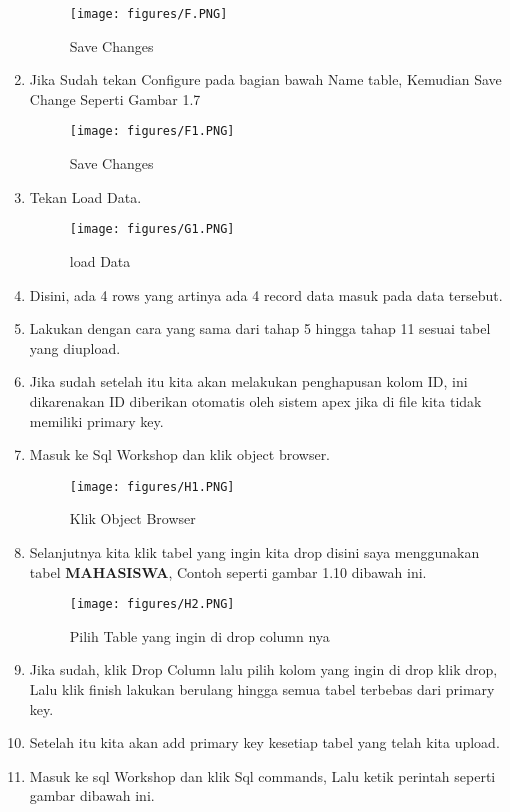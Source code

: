 \begin{enumerate}
\begin{figure}[!htbp]
\centering
\texttt{[image: figures/F.PNG]}
\caption{Save Changes}
\label{penanda}
\end{figure}
\item Jika Sudah tekan Configure pada bagian bawah Name table, Kemudian Save Change Seperti Gambar 1.7
\begin{figure}[!htbp]
\centering
\texttt{[image: figures/F1.PNG]}
\caption{Save Changes}
\label{penanda}
\end{figure}
\item Tekan Load Data.
\begin{figure}[!htbp]
\centering
\texttt{[image: figures/G1.PNG]}
\caption{load Data}
\label{penanda}
\end{figure}
\item Disini, ada 4 rows yang artinya ada 4 record data masuk pada data tersebut.
\item  Lakukan dengan cara yang sama dari tahap 5 hingga tahap 11 sesuai tabel yang diupload.
\item  Jika sudah setelah itu kita akan melakukan penghapusan kolom ID, ini dikarenakan ID diberikan otomatis oleh sistem apex jika di file kita tidak memiliki primary key.
\item Masuk ke Sql Workshop dan klik object browser.
\begin{figure}[!htbp]
\centering
\texttt{[image: figures/H1.PNG]}
\caption{Klik Object Browser}
\label{penanda}
\end{figure}
\item Selanjutnya kita klik tabel yang ingin kita drop disini saya menggunakan tabel \textbf{MAHASISWA}, Contoh seperti gambar 1.10 dibawah ini.
\begin{figure}[!htbp]
\centering
\texttt{[image: figures/H2.PNG]}
\caption{Pilih Table yang ingin di drop column nya}
\label{penanda}
\end{figure}
\item Jika sudah, klik Drop Column lalu pilih kolom yang ingin di drop klik drop, Lalu klik finish lakukan berulang hingga semua tabel terbebas dari primary key.
\item Setelah itu kita akan add primary key kesetiap tabel yang telah kita upload.
\item Masuk ke sql Workshop dan klik Sql commands, Lalu ketik perintah seperti gambar dibawah ini.
\begin{figure}[!htbp]

\end{figure}
\end{enumerate}
